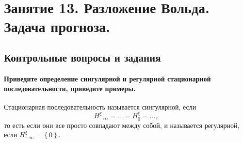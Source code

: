 \chapter*{Занятие 13. Разложение Вольда. Задача прогноза.}

\section*{Контрольные вопросы и задания}

\subsubsection*{Приведите определение сингулярной и регулярной стационарной последовательности,
                приведите примеры.}

Стационарная последовательность называется сингулярной, если
\begin{equation*}
  H_{-\infty }^{ \xi } =
  \dotsc =
  H_0^{ \xi } =
  \dotsc,
\end{equation*}
то есть если они все просто совпадают между собой, и называется регулярной,
если $H_{-\infty }^{ \xi } = \left\{ 0 \right\} $.

